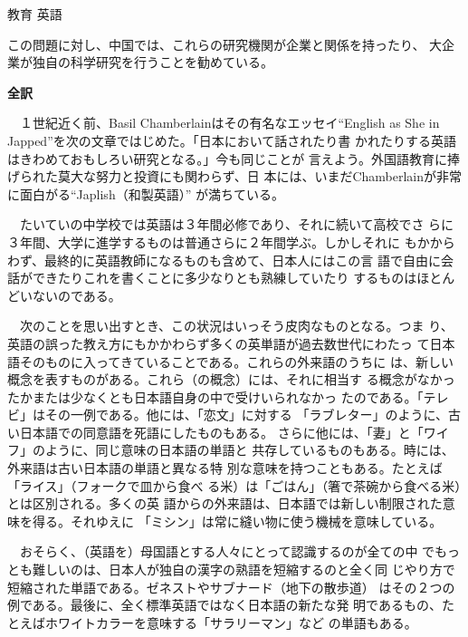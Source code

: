 \documentclass[fleqn]{jbook}
\begin{document}
\begin{answer}{教育 英語}{}
\begin{subanswers}
\begin{subsubanswers}
  この問題に対し、中国では、これらの研究機関が企業と関係を持ったり、
大企業が独自の科学研究を行うことを勧めている。

  \end{subsubanswers}

\SubAnswer 
{\bf 全訳} 
        
  　１世紀近く前、Basil Chamberlainはその有名なエッセイ``English as
  She in Japped''を次の文章ではじめた。「日本において話されたり書
  かれたりする英語はきわめておもしろい研究となる。」今も同じことが
  言えよう。外国語教育に捧げられた莫大な努力と投資にも関わらず、日
  本には、いまだChamberlainが非常に面白がる``Japlish（和製英語）''
  が満ちている。

  　たいていの中学校では英語は３年間必修であり、それに続いて高校でさ
らに３年間、大学に進学するものは普通さらに２年間学ぶ。しかしそれに
もかからわず、最終的に英語教師になるものも含めて、日本人にはこの言
語で自由に会話ができたりこれを書くことに多少なりとも熟練していたり
するものはほとんどいないのである。

  　次のことを思い出すとき、この状況はいっそう皮肉なものとなる。つま
り、英語の誤った教え方にもかかわらず多くの英単語が過去数世代にわたっ
て日本語そのものに入ってきていることである。これらの外来語のうちに
は、新しい概念を表すものがある。これら（の概念）には、それに相当す
る概念がなかったかまたは少なくとも日本語自身の中で受けいられなかっ
たのである。「テレビ」はその一例である。他には、「恋文」に対する
「ラブレター」のように、古い日本語での同意語を死語にしたものもある。
さらに他には、「妻」と「ワイフ」のように、同じ意味の日本語の単語と
共存しているものもある。時には、外来語は古い日本語の単語と異なる特
別な意味を持つこともある。たとえば「ライス」（フォークで皿から食べ
る米）は「ごはん」（箸で茶碗から食べる米）とは区別される。多くの英
語からの外来語は、日本語では新しい制限された意味を得る。それゆえに
「ミシン」は常に縫い物に使う機械を意味している。

  　おそらく、（英語を）母国語とする人々にとって認識するのが全ての中
でもっとも難しいのは、日本人が独自の漢字の熟語を短縮するのと全く同
じやり方で短縮された単語である。ゼネストやサブナード（地下の散歩道）
はその２つの例である。最後に、全く標準英語ではなく日本語の新たな発
明であるもの、たとえばホワイトカラーを意味する「サラリーマン」など
の単語もある。


\end{subanswers}
\end{answer}
\end{document}

